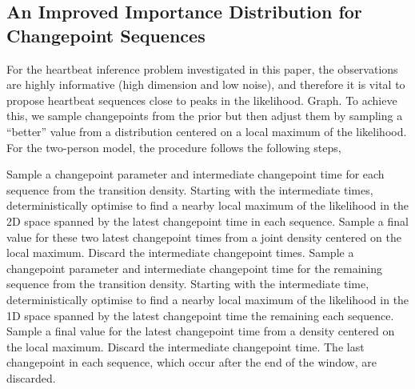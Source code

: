 \documentclass{article}
\begin{document}
\subsection{An Improved Importance Distribution for Changepoint Sequences}

For the heartbeat inference problem investigated in this paper, the observations are highly informative (high dimension and low noise), and therefore it is vital to propose heartbeat sequences close to peaks in the likelihood. {\meta Graph.} To achieve this, we sample changepoints from the prior but then adjust them by sampling a ``better'' value from a distribution centered on a local maximum of the likelihood. For the two-person model, the procedure follows the following steps,
%
\begin{algorithmic}[1]
    \STATE Sample a changepoint parameter and intermediate changepoint time for each sequence from the transition density.
    \STATE Starting with the intermediate times, deterministically optimise to find a nearby local maximum of the likelihood in the 2D space spanned by the latest changepoint time in each sequence.
    \STATE Sample a final value for these two latest changepoint times from a joint density centered on the local maximum.
    \STATE Discard the intermediate changepoint times.
  \ENDWHILE
    \STATE Sample a changepoint parameter and intermediate changepoint time for the remaining sequence from the transition density.
    \STATE Starting with the intermediate time, deterministically optimise to find a nearby local maximum of the likelihood in the 1D space spanned by the latest changepoint time the remaining each sequence.
    \STATE Sample a final value for the latest changepoint time from a density centered on the local maximum.
    \STATE Discard the intermediate changepoint time.
  \ENDWHILE
  \STATE The last changepoint in each sequence, which occur after the end of the window, are discarded.
\end{algorithmic}
\end{document}
